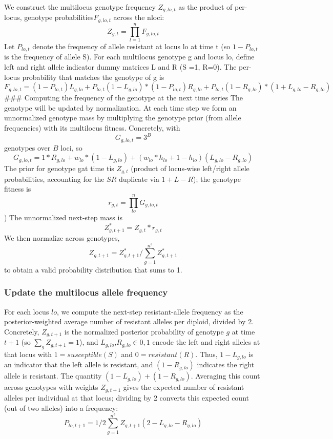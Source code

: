 \documentclass[
]{article}
\begin{document}
We construct the multilocus genotype frequency \(Z_{g,lo,t}\) as the
product of per-locus, genotype probabilities\(F_{g,lo,t}\) across the
nloci: \[Z_{g,t} = \prod_{l=1}^{n} F_{g,lo,t}
\] Let \(P_{lo,t}\) denote the frequency of allele resistant at locus lo
at time t (so \(1-P_{lo,t}\) is the frequency of allele S). For each
multilocus genotype g and locus lo, define left and right allele
indicator dummy matrices L and R (S =1, R=0). The per-locus probability
that matches the genotype of g is
\[F_{g,lo,t} = (1 - P_{lo, t})L_{g, lo} + P_{lo, t} (1 - L_{g, lo}) *
(1 - P_{lo, t})R_{g, lo} + P_{lo, t} (1 - R_{g, lo}) * (1 + L_{g, lo} - R_{g, lo})
\] \#\#\# Computing the frequency of the genotype at the next time
series The genotype will be updated by normalization. At each time step
we form an unnormalized genotype mass by multiplying the genotype prior
(from allele frequencies) with its multilocus fitness. Concretely, with
\[G_{g,lo,t} = 3^{B}\] genotypes over \(B\) loci, so
\[G_{g,lo,t} = 1 * R_{g, lo} + w_{lo} * (1 - L_{g, lo}) + 
        (w_{lo} * h_{lo} + 1 - h_{lo}) (L_{g, lo} - R_{g, lo})
        \] The prior for genotype gat time tis \(Z_{g,t}\) (product of
locus-wise left/right allele probabilities, accounting for the \(SR\)
duplicate via \(1+L-R\)); the genotype fitness is
\[r_{g,t} = \prod_{lo}^{n} G_{g,lo,t}\] ) The unnormalized next-step
mass is \[Z_{g,t+1}^{*} = Z_{g,t} * r_{g,t}\] We then normalize across
genotypes, \[Z_{g,t+1} = Z_{g,t+1}^{*}/ \sum_{g=1}^{n^{3}} Z_{g,t+1}^{*}
\] to obtain a valid probability distribution that sums to 1.

\subsubsection{Update the multilocus allele
frequency}\label{update-the-multilocus-allele-frequency}

For each locus \(lo\), we compute the next-step resistant-allele
frequency as the posterior-weighted average number of resistant alleles
per diploid, divided by 2. Concretely, \(Z_{g,t+1}\) is the normalized
posterior probability of genotype \(g\) at time \(t+1\) (so
\(\sum_{g} Z_{g, t+1}=1\)), and \(L_{g,lo}\),\(R_{g,lo}∈{0,1}\) encode
the left and right alleles at that locus with \(1 = susceptible (S)\)
and \(0 = resistant (R)\). Thus, \(1 - L_{g,lo}\) is an indicator that
the left allele is resistant, and \((1 - R_{g,lo})\) indicates the right
allele is resistant. The quantity \((1 - L_{g,lo})+(1 - R_{g,lo})\).
Averaging this count across genotypes with weights \(Z_{g,t+1}\) gives
the expected number of resistant alleles per individual at that locus;
dividing by 2 converts this expected count (out of two alleles) into a
frequency:
\[P_{lo, t+1} = 1/2  \sum_{g=1}^{n^{3}} Z_{g, t+1} (2 - L_{g, lo} - R_{g, lo})\]
\end{document}
